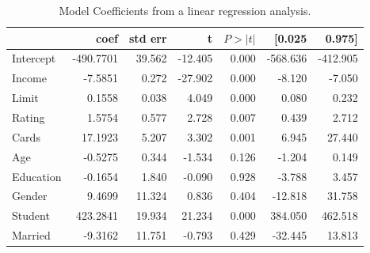 \documentclass[addpoints,11pt]{exam}
\begin{document}
\begin{questions}
\begin{table}[h]
  \centering
  \caption{Model Coefficients from a linear regression analysis.}\label{credit_model}
  \begin{tabular}{l r r r r r r}
    \hline
	& coef	& std err	& t	 & $P>|t|$	& [0.025	& 0.975]\\
\hline
Intercept & -490.7701 & 39.562	& -12.405    & 0.000	& -568.636 &	-412.905\\
Income	& -7.5851	& 0.272	    & -27.902	 & 0.000	& -8.120 &	-7.050\\
Limit	& 0.1558	& 0.038	    & 4.049	     & 0.000	& 0.080 &	0.232\\
Rating	& 1.5754	& 0.577	    & 2.728	     & 0.007	& 0.439	& 2.712\\
Cards	& 17.1923	& 5.207	    & 3.302	     & 0.001	& 6.945	& 27.440\\
Age	    & -0.5275	& 0.344	    & -1.534     &	0.126  & -1.204	& 0.149\\
Education &	-0.1654	& 1.840	    & -0.090     &	0.928    &	-3.788	& 3.457\\
Gender	& 9.4699	& 11.324	& 0.836	     & 0.404	& -12.818	& 31.758\\
Student	& 423.2841	& 19.934	& 21.234     &	0.000 &	384.050	& 462.518\\
Married	& -9.3162	& 11.751	& -0.793     &	0.429 & -32.445	& 13.813\\
\hline
  \end{tabular}
\end{table}
\noaddpoints

\end{questions}
\end{document}
